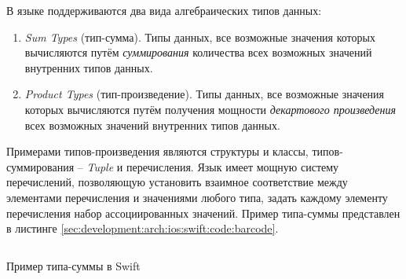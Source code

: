 В языке поддерживаются два вида алгебраических типов данных:

\begin{enumerate}
	\item \emph{Sum Types} (тип-сумма). Типы данных, все возможные значения которых вычисляются путём \textit{суммирования} количества всех возможных значений внутренних типов данных.
	\item \emph{Product Types} (тип-произведение). Типы данных, все возможные значения которых вычисляются путём получения мощности \textit{декартового произведения} всех возможных значений внутренних типов данных.
\end{enumerate}

Примерами типов-произведения являются структуры и классы, типов-суммирования -- \textit{Tuple} и перечисления. Язык имеет мощную систему перечислений, позволяющую установить взаимное соответствие между элементами перечисления и значениями любого типа, задать каждому элементу перечисления набор ассоциированных значений. Пример типа-суммы представлен в листинге \ref{sec:development:arch:ios:swift:code:barcode}.

\begin{code}
	\inputminted{swift}{inc/src/swift_enum_sample.swift}
   \caption{Пример типа-суммы в Swift}
   \label{sec:development:arch:ios:swift:code:barcode}
\end{code}